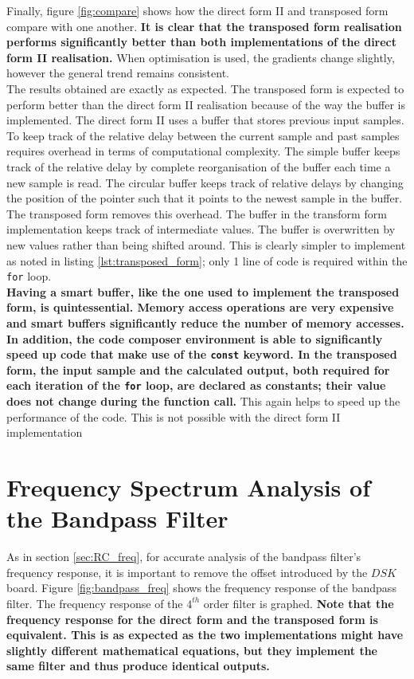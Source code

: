 \documentclass{article}
\begin{document}
Finally, figure \ref{fig:compare} shows how the direct form II and transposed form compare with one another. \textbf{It is clear that the transposed form realisation performs significantly better than both implementations of the direct form II realisation.} When optimisation is used, the gradients change slightly, however the general trend remains consistent.\\

The results obtained are exactly as expected. The transposed form is expected to perform better than the direct form II realisation because of the way the buffer is implemented. The direct form II uses a buffer that stores previous input samples. To keep track of the relative delay between the current sample and past samples requires overhead in terms of computational complexity. The simple buffer keeps track of the relative delay by complete reorganisation of the buffer each time a new sample is read. The circular buffer keeps track of relative delays by changing the position of the pointer such that it points to the newest sample in the buffer.\\

The transposed form removes this overhead. The buffer in the transform form implementation keeps track of intermediate values. The buffer is overwritten by new values rather than being shifted around. This is clearly simpler to implement as noted in listing \ref{lst:transposed_form}; only 1 line of code is required within the {\tt for} loop. \\ 

\textbf{Having a smart buffer, like the one used to implement the transposed form, is quintessential. Memory access operations are very expensive and smart buffers significantly reduce the number of memory accesses.} \\

\textbf{In addition, the code composer environment is able to significantly speed up code that make use of the {\tt const} keyword. In the transposed form, the input sample and the calculated output, both required for each iteration of the {\tt for} loop, are declared as constants; their value does not change during the function call.} This again helps to speed up the performance of the code. This is not possible with the direct form II implementation 

\section{Frequency Spectrum Analysis of the Bandpass Filter}
As in section \ref{sec:RC_freq}, for accurate analysis of the bandpass filter's frequency response, it is important to remove the offset introduced by the $DSK$ board. Figure \ref{fig:bandpass_freq} shows the frequency response of the bandpass filter. The frequency response of the $4^{th}$ order filter is graphed. \textbf{Note that the frequency response for the direct form and the transposed form is equivalent. This is as expected as the two implementations might have slightly different mathematical equations, but they implement the same filter and thus produce identical outputs.}
\end{document}
